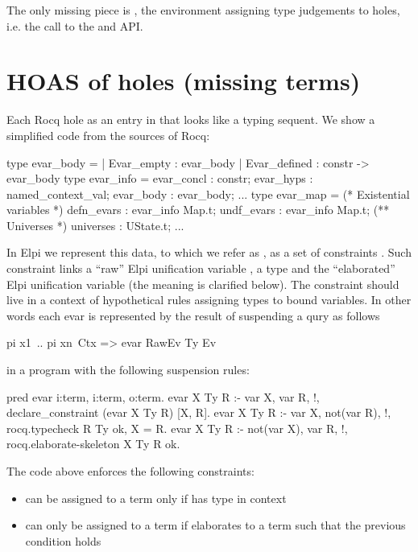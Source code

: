 \documentclass[a4paper, 11pt]{book}
\begin{document}
The only missing piece is , the environment assigning
type judgements to holes, i.e. the call to the  and
 API.

\section{HOAS of holes (missing terms)}\label{sec:hoasholes}

Each Rocq hole as an entry in  that looks like a
typing sequent. We show a simplified code from the sources of Rocq:

\begin{ocamlcode}
type evar_body =
  | Evar_empty : evar_body
  | Evar_defined : constr -> evar_body
type evar_info = {
  evar_concl : constr;
  evar_hyps : named_context_val;
  evar_body : evar_body;
  ...
}
type evar_map = {
  (* Existential variables *)
  defn_evars : evar_info Map.t;
  undf_evars : evar_info Map.t;
  (** Universes *)
  universes  : UState.t;
  ...
}
\end{ocamlcode}

In Elpi we represent this data, to which we refer as ,
as a set of constraints .
Such constraint links a ``raw'' Elpi unification variable ,
a type and the ``elaborated'' Elpi unification variable  (the meaning
is clarified below).
The constraint should live in a context of hypothetical rules
 assigning types to bound variables. In other words
each evar is represented by the result of suspending a qury as follows

\begin{elpicode}
  pi x1\ .. pi xn\ Ctx => evar RawEv Ty Ev
\end{elpicode}

\noindent in a program with the following suspension rules:

\begin{elpicode}
pred evar i:term, i:term, o:term. %
evar X Ty R :- var X, var R,      !, declare_constraint (evar X Ty R) [X, R].
evar X Ty R :- var X, not(var R), !, rocq.typecheck R Ty ok, X = R.
evar X Ty R :- not(var X), var R, !, rocq.elaborate-skeleton X Ty R ok.
\end{elpicode}

\noindent
The code above enforces the following constraints:

\begin{itemize}
  \item {} can be assigned to a term  only if
         has type  in context 
  \item {} can only be assigned to a term  if
         elaborates to a term  such that
        the previous condition holds
\end{itemize}
\end{document}
